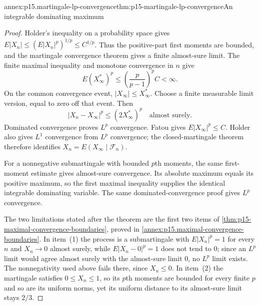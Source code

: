 \begin{annexitem}{annex:p15.martingale-lp-convergence}{thm:p15-martingale-lp-convergence}{An integrable dominating maximum}
\begin{proof}
Holder's inequality on a probability space gives
\(E|X_n|\leq(E|X_n|^p)^{1/p}\leq C^{1/p}\).
Thus the positive-part first moments are bounded, and the
martingale convergence theorem gives a finite almost-sure limit.
The finite maximal inequality and monotone convergence in \(n\)
give
\[
                        E(X_\infty^*)^p
                              \leq\left(\frac p{p-1}\right)^pC<\infty.
\]
On the common convergence event, \(|X_\infty|\leq X_\infty^*\).
Choose a finite measurable limit version, equal to zero off that
event. Then
\[
                    |X_n-X_\infty|^p\leq(2X_\infty^*)^p
                                    \quad\text{almost surely}.
\]
Dominated convergence proves \(L^p\) convergence.
Fatou gives \(E|X_\infty|^p\leq C\).
Holder also gives \(L^1\) convergence from \(L^p\) convergence;
the closed-martingale theorem therefore identifies
\(X_n=E(X_\infty\mid\mathcal F_n)\).

For a nonnegative submartingale with bounded \(p\)th moments,
the same first-moment estimate gives almost-sure convergence.
Its absolute maximum equals its positive maximum, so the first
maximal inequality supplies the identical integrable dominating
variable. The same dominated-convergence proof gives \(L^p\)
convergence.

The two limitations stated after the theorem are the first two items
of \cref{thm:p15-maximal-convergence-boundaries}, proved in
\cref{annex:p15.maximal-convergence-boundaries}. In item~(1) the
process is a submartingale with \(E|X_n|^p=1\) for every \(n\) and
\(X_n\to0\) almost surely, while \(E|X_n-0|^p=1\) does not tend to
\(0\); since an \(L^p\) limit would agree almost surely with the
almost-sure limit \(0\), no \(L^p\) limit exists. The nonnegativity
used above fails there, since \(X_n\leq0\). In item~(2) the
martingale satisfies \(0\leq X_n\leq1\), so its \(p\)th moments are
bounded for every finite \(p\) and so are its uniform norms, yet its
uniform distance to its almost-sure limit stays \(2/3\).
\end{proof}
\end{annexitem}

